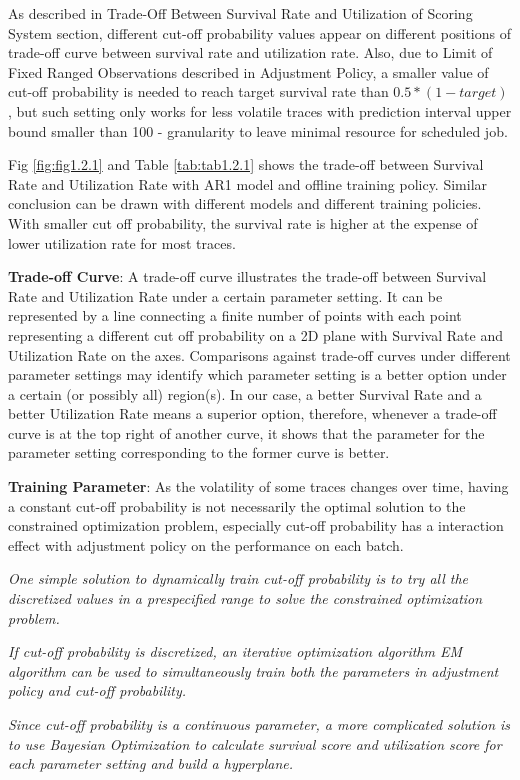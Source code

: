 \documentclass{article}
\begin{document}
\begin{flushleft}
As described in Trade-Off Between Survival Rate and Utilization of Scoring System section, different cut-off probability values appear on different positions of trade-off curve between survival rate and utilization rate. Also, due to Limit of Fixed Ranged Observations described in Adjustment Policy, a smaller value of cut-off probability is needed to reach target survival rate than $0.5 * (1 - target)$, but such setting only works for less volatile traces with prediction interval upper bound smaller than 100 - granularity to leave minimal resource for scheduled job.
\end{flushleft}

\begin{flushleft}
Fig \ref{fig:fig1.2.1} and Table \ref{tab:tab1.2.1} shows the trade-off between Survival Rate and Utilization Rate with AR1 model and offline training policy. Similar conclusion can be drawn with different models and different training policies. With smaller cut off probability, the survival rate is higher at the expense of lower utilization rate for most traces.
\end{flushleft}

\begin{flushleft}
\textbf{Trade-off Curve}: A trade-off curve illustrates the trade-off between Survival Rate and Utilization Rate under a certain parameter setting. It can be represented by a line connecting a finite number of points with each point representing a different cut off probability on a 2D plane with Survival Rate and Utilization Rate on the axes. Comparisons against trade-off curves under different parameter settings may identify which parameter setting is a better option under a certain (or possibly all) region(s). In our case, a better Survival Rate and a better Utilization Rate means a superior option, therefore, whenever a trade-off curve is at the top right of another curve, it shows that the parameter for the parameter setting corresponding to the former curve is better. 
\end{flushleft}

\begin{flushleft}
\textbf{Training Parameter}: As the volatility of some traces changes over time, having a constant cut-off probability is not necessarily the optimal solution to the constrained optimization problem, especially cut-off probability has a interaction effect with adjustment policy on the performance on each batch.

\textit{One simple solution to dynamically train cut-off probability is to try all the discretized values in a prespecified range to solve the constrained optimization problem.}

\textit{If cut-off probability is discretized, an iterative optimization algorithm EM algorithm can be used to simultaneously train both the parameters in adjustment policy and cut-off probability. }

\textit{Since cut-off probability is a continuous parameter, a more complicated solution is to use Bayesian Optimization to calculate survival score and utilization score for each parameter setting and build a hyperplane.}
\end{flushleft}
\end{document}
